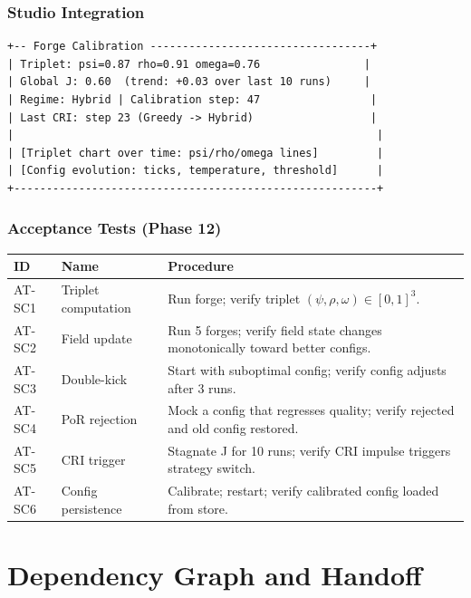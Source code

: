\documentclass[11pt,a4paper,twoside]{article}
\theoremstyle{definition}
\theoremstyle{plain}
\theoremstyle{remark}
\begin{document}
\section{Studio Integration}\label{sec:se:studio}

\begin{lstlisting}[title={Enhanced Dashboard: Calibration Panel}]
+-- Forge Calibration ----------------------------------+
| Triplet: psi=0.87 rho=0.91 omega=0.76                |
| Global J: 0.60  (trend: +0.03 over last 10 runs)     |
| Regime: Hybrid | Calibration step: 47                 |
| Last CRI: step 23 (Greedy -> Hybrid)                  |
|                                                        |
| [Triplet chart over time: psi/rho/omega lines]         |
| [Config evolution: ticks, temperature, threshold]      |
+--------------------------------------------------------+
\end{lstlisting}


\section{Acceptance Tests (Phase 12)}\label{sec:se:tests}

\begin{longtable}{l l p{5.5cm}}
\toprule
\textbf{ID} & \textbf{Name} & \textbf{Procedure} \\
\midrule
AT-SC1 & Triplet computation & Run forge; verify triplet
  $(\psi,\rho,\omega) \in [0,1]^3$. \\
AT-SC2 & Field update & Run 5 forges; verify field state changes
  monotonically toward better configs. \\
AT-SC3 & Double-kick & Start with suboptimal config; verify
  config adjusts after 3 runs. \\
AT-SC4 & PoR rejection & Mock a config that regresses quality;
  verify rejected and old config restored. \\
AT-SC5 & CRI trigger & Stagnate J for 10 runs; verify CRI
  impulse triggers strategy switch. \\
AT-SC6 & Config persistence & Calibrate; restart; verify
  calibrated config loaded from store. \\
\end{longtable}


\part{Dependency Graph and Handoff}\label{part:handoff}
\end{document}
